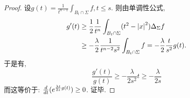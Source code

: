 \begin{proof}
    设$g(t)=\frac{1}{t^{n-1}}\int_{B_t\cap \Sigma}f, t\le s$. 则由单调性公式, 
    \begin{equation}
        \begin{split}
            g'(t) &\ge \frac{1}{2}\frac{1}{t^n}\int_{B_t\cap \Sigma}(t^2-\left | x \right |^2)\Delta_\Sigma f \\
            &\ge -\frac{\lambda}{2}\frac{1}{t^{n-2}s^2}\int_{B_t\cap \Sigma}f = -\frac{\lambda}{2}\frac{t}{s^2}g(t).
        \end{split}
    \end{equation}
    于是有,
    \begin{equation}
        \frac{g'(t)}{g(t)} \ge - \frac{\lambda}{2s^2}t\ge -\frac{\lambda}{2s}
    \end{equation}
    而这等价于: $\frac{d}{dt} (e^{\frac{\lambda t}{2s}g(t)}) \ge 0$. 证毕.
\end{proof}
